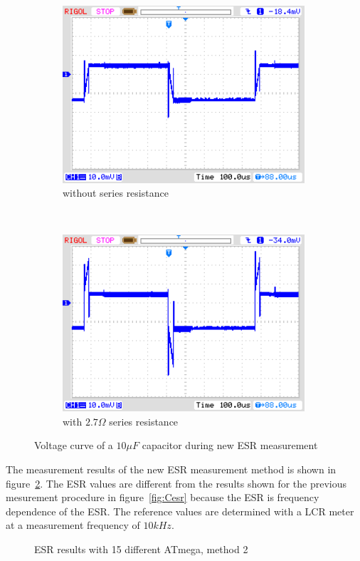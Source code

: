 \begin{figure}[H]
  \begin{subfigure}[b]{9cm}
    \centering
    \includegraphics[width=9cm]{../PNG/NewEsr10uF0R0.png}
    \caption{without series resistance}
  \end{subfigure}
  ~
  \begin{subfigure}[b]{9cm}
    \centering
    \includegraphics[width=9cm]{../PNG/NewEsr10uF2R7.png}
    \caption{with \(2.7\Omega\) series resistance}
  \end{subfigure}
  \caption{Voltage curve of a \(10\mu F\) capacitor during new ESR measurement}
  \label{pic:NewEsr10}
\end{figure}

The measurement results of the new ESR measurement method is shown in figure~\ref{fig:Cesr2}.
The ESR values are different from the results shown for the previous mesurement procedure in figure~\ref{fig:Cesr} because 
the ESR is frequency dependence of the ESR.
The reference values are determined with a LCR meter at a measurement frequency of \(10 kHz \).

\begin{figure}[H]
\centering

\caption{ESR results with 15 different ATmega, method 2}
\label{fig:Cesr2}
\end{figure}

